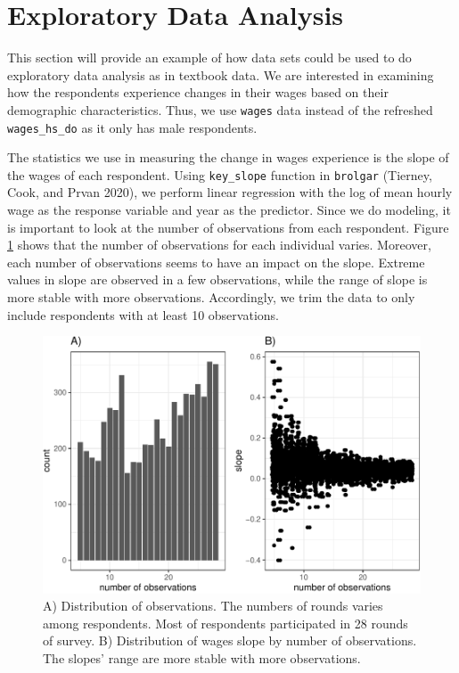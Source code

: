 \documentclass{article}
\begin{document}
\hypertarget{eda}{%
\section{Exploratory Data Analysis}\label{eda}}

This section will provide an example of how data sets could be used to do exploratory data analysis as in textbook data. We are interested in examining how the respondents experience changes in their wages based on their demographic characteristics. Thus, we use \texttt{wages} data instead of the refreshed \texttt{wages\_hs\_do} as it only has male respondents.

The statistics we use in measuring the change in wages experience is the slope of the wages of each respondent.
Using \texttt{key\_slope} function in \texttt{brolgar} (Tierney, Cook, and Prvan 2020), we perform linear regression with the log of mean hourly wage as the response variable and year as the predictor. Since we do modeling, it is important to look at the number of observations from each respondent. Figure \ref{fig:slope-nobs-plot} shows that the number of observations for each individual varies. Moreover, each number of observations seems to have an impact on the slope. Extreme values in slope are observed in a few observations, while the range of slope is more stable with more observations. Accordingly, we trim the data to only include respondents with at least 10 observations.

\begin{figure}

{\centering \includegraphics[width=0.7\linewidth]{figures/slope-nobs-plot-1} 

}

\caption{A) Distribution of observations. The numbers of rounds varies among respondents. Most of respondents participated in 28 rounds of survey. B) Distribution of wages slope by number of observations. The slopes' range are more stable with more observations.}\label{fig:slope-nobs-plot}
\end{figure}
\end{document}

